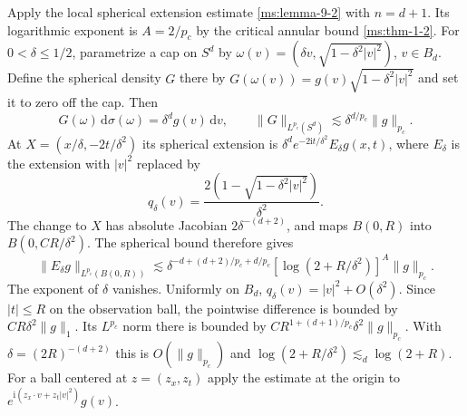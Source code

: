 Apply the local spherical extension estimate \ref{ms:lemma-9-2} with $n=d+1$. Its logarithmic exponent is $A=2/p_c$ by the critical annular bound \ref{ms:thm-1-2}. For $0<\delta\leq 1/2$, parametrize a cap on $S^d$ by $\omega(v)=(\delta v,\sqrt{1-\delta^2|v|^2})$, $v\in B_d$. Define the spherical density $G$ there by $G(\omega(v))=g(v)\sqrt{1-\delta^2|v|^2}$ and set it to zero off the cap. Then
\[
G(\omega)\,\mathrm d\sigma(\omega)=\delta^d g(v)\,\mathrm dv,
\qquad
\|G\|_{L^{p_c}(S^d)}\lesssim \delta^{d/p_c}\|g\|_{p_c}.
\]
At $X=(x/\delta,-2t/\delta^2)$ its spherical extension is $\delta^d e^{-2\mathrm it/\delta^2} E_\delta g(x,t)$, where $E_\delta$ is the extension with $|v|^2$ replaced by
\[
q_\delta(v)=\frac{2(1-\sqrt{1-\delta^2|v|^2})}{\delta^2}.
\]
The change to $X$ has absolute Jacobian $2\delta^{-(d+2)}$, and maps $B(0,R)$ into $B(0,CR/\delta^2)$. The spherical bound therefore gives
\[
\|E_\delta g\|_{L^{p_c}(B(0,R))}
 \lesssim \delta^{-d+(d+2)/p_c+d/p_c}
 [\log(2+R/\delta^2)]^A\|g\|_{p_c}.
\]
The exponent of $\delta$ vanishes. Uniformly on $B_d$, $q_\delta(v)=|v|^2+O(\delta^2)$. Since $|t|\leq R$ on the observation ball, the pointwise difference is bounded by $CR\delta^2\|g\|_1$. Its $L^{p_c}$ norm there is bounded by $C R^{1+(d+1)/p_c}\delta^2\|g\|_{p_c}$. With $\delta=(2R)^{-(d+2)}$ this is $O(\|g\|_{p_c})$ and $\log(2+R/\delta^2)\lesssim_d \log(2+R)$. For a ball centered at $z=(z_x,z_t)$ apply the estimate at the origin to $e^{\mathrm i(z_x\cdot v+z_t|v|^2)}g(v)$.
